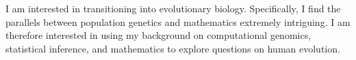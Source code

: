 \begin{cventries}
{\begin{cvitems}
            \item {
            \begin{flushleft}
              I am interested in transitioning into evolutionary biology.
              Specifically, I find the parallels between population genetics and
              mathematics extremely intriguing. I am therefore
              interested in using my background on computational genomics,
              statistical inference, and mathematics to explore
              questions on human evolution.  
          \end{flushleft}
            }
          \end{cvitems}
        }
        
\end{cventries}
